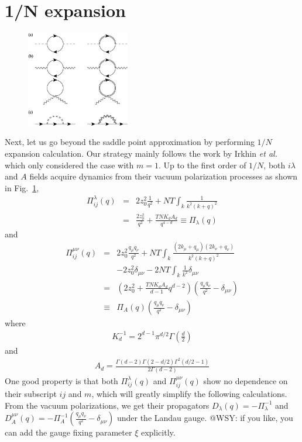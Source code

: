 \documentclass[aps,twocolumn,superscriptaddress]{revtex4-1}
\newcommand{\bea}{\begin{eqnarray}}
\newcommand{\eea}{\end{eqnarray}}
\newcommand{\etal}{\textit{et al.{ }}}
\begin{document}
\section{1/N expansion}
\begin{figure}
\includegraphics[width=0.4\textwidth]{self.eps}
\caption{\label{fig:self}}
\end{figure}
Next, let us go
beyond the saddle point approximation by performing $1/N$ expansion calculation. Our strategy mainly follows the work by
Irkhin \etal \cite{irkhin1996} which only considered the case with $m=1$. Up to the first order of $1/N$, both
$i\lambda$ and $A$ fields acquire dynamics from their vacuum polarization processes as shown in Fig.~\ref{fig:self},
\bea \Pi_{ij}^\lambda(q)&=&2z_0^2\frac{1}{q^2} + NT\int_k \frac{1}{k^2(k+q)^2} \nonumber\\
                        &=&\frac{2z_0^2}{q^2}+\frac{TNK_dA_d}{q^{4-d}} \equiv \Pi_\lambda(q) \eea and \bea
\Pi_{ij}^{\mu\nu}(q) &=& 2z_0^2 \frac{q_\mu q_\nu}{q^2} + NT\int_k \frac{(2k_\mu+q_\mu)(2k_\nu+q_\nu)}{k^2(k+q)^2}
\nonumber\\ && - 2z_0^2 \delta_{\mu\nu} -2NT\int_k \frac{1}{k^2}\delta_{\mu\nu}  \nonumber\\
            &=&\left(2z_0^2+\frac{TNK_dA_d}{d-1} q^{d-2}\right)\left(\frac{q_\mu q_\nu}{q^2}-\delta_{\mu\nu}\right)
\nonumber\\ &\equiv& \Pi_A(q)\left(\frac{q_\mu q_\nu}{q^2}-\delta_{\mu\nu}\right) \eea where \bea
K_d^{-1}=2^{d-1}\pi^{d/2}\Gamma\left(\frac{d}{2}\right) \eea and \bea
A_d=\frac{\Gamma(d-2)\Gamma(2-d/2)\Gamma^2(d/2-1)}{2\Gamma(d-2)} \eea One good property is that both
$\Pi_{ij}^\lambda(q)$ and $\Pi_{ij}^{\mu\nu}(q)$ show no dependence on their subscript $ij$ and $m$, which will greatly
simplify the following calculations. From the vacuum polarizations, we get their propagators
$D_\lambda(q)=-\Pi_\lambda^{-1}$ and $D_A^{\mu\nu}(q)=-\Pi_A^{-1}\left(\frac{q_\mu q_\nu}{q^2}-\delta_{\mu\nu}\right)$
under the Landau gauge. {\color{red} @WSY: if you like, you can add the gauge fixing parameter $\xi$ explicitly.}
\end{document}
